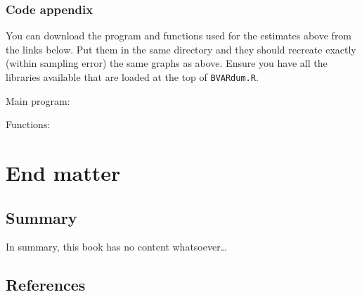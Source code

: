 \documentclass[
  letterpaper,
]{book}
\begin{document}
\hypertarget{code-appendix}{%
\section{Code appendix}\label{code-appendix}}

You can download the program and functions used for the estimates above
from the links below. Put them in the same directory and they should
recreate exactly (within sampling error) the same graphs as above.
Ensure you have all the libraries available that are loaded at the top
of \texttt{BVARdum.R}.

Main program:

Functions:

\part{End matter}

\hypertarget{summary}{%
\chapter{Summary}\label{summary}}

In summary, this book has no content whatsoever\ldots{}

\hypertarget{references}{%
\chapter*{References}\label{references}}

\end{document}

